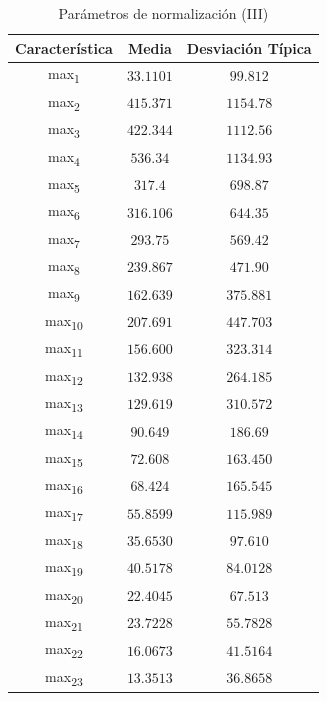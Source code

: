 \documentclass[12pt]{article}
\begin{document}
\begin{table}
	\caption{Parámetros de normalización (III)}
	\centering
		\begin{tabular}{||c c c||}
			\hline
			Característica & Media & Desviación Típica  \\ [0.5ex]
			\hline\hline
			max\textsubscript{1} & $33.1101$ & $99.812$ \\
			\hline
			max\textsubscript{2} & $415.371$ & $1154.78$ \\
			\hline
			max\textsubscript{3} & $422.344$ & $1112.56$ \\
			\hline
			max\textsubscript{4} & $536.34$ & $1134.93$ \\
			\hline
			max\textsubscript{5} & $317.4$ & $698.87$ \\
			\hline
			max\textsubscript{6} & $316.106$ & $644.35$ \\
			\hline
			max\textsubscript{7} & $293.75$ & $569.42$ \\
			\hline
			max\textsubscript{8} & $239.867$ & $471.90$ \\
			\hline
			max\textsubscript{9} & $162.639$ & $375.881$ \\
			\hline
			max\textsubscript{10} & $207.691$ & $447.703$ \\
			\hline
			max\textsubscript{11} & $156.600$ & $323.314$ \\
			\hline
			max\textsubscript{12} & $132.938$ & $264.185$ \\
			\hline
			max\textsubscript{13} & $129.619$ & $310.572$ \\
			\hline
			max\textsubscript{14} & $90.649$ & $186.69$ \\
			\hline
			max\textsubscript{15} & $72.608$ & $163.450$ \\
			\hline
			max\textsubscript{16} & $68.424$ & $165.545$ \\
			\hline
			max\textsubscript{17} & $55.8599$ & $115.989$ \\
			\hline
			max\textsubscript{18} & $35.6530$ & $97.610$ \\
			\hline
			max\textsubscript{19} & $40.5178$ & $84.0128$ \\
			\hline
			max\textsubscript{20} & $22.4045$ & $67.513$ \\
			\hline
			max\textsubscript{21} & $23.7228$ & $55.7828$ \\
			\hline
			max\textsubscript{22} & $16.0673$ & $41.5164$ \\
			\hline
			max\textsubscript{23} & $13.3513$ & $36.8658$ \\

\end{tabular}
\end{table}
\end{document}
